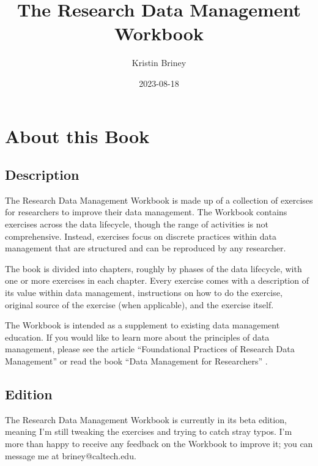\documentclass[
]{book}
\title{The Research Data Management Workbook}
\author{Kristin Briney}
\date{2023-08-18}
\begin{document}
\maketitle

{
\setcounter{tocdepth}{1}
\tableofcontents
}
\hypertarget{about-this-book}{%
\chapter*{About this Book}\label{about-this-book}}

\hypertarget{description}{%
\section*{Description}\label{description}}

The Research Data Management Workbook is made up of a collection of exercises for researchers to improve their data management. The Workbook contains exercises across the data lifecycle, though the range of activities is not comprehensive. Instead, exercises focus on discrete practices within data management that are structured and can be reproduced by any researcher.

The book is divided into chapters, roughly by phases of the data lifecycle, with one or more exercises in each chapter. Every exercise comes with a description of its value within data management, instructions on how to do the exercise, original source of the exercise (when applicable), and the exercise itself.

The Workbook is intended as a supplement to existing data management education. If you would like to learn more about the principles of data management, please see the article ``Foundational Practices of Research Data Management'' \citep{briney_foundational_2020} or read the book ``Data Management for Researchers'' \citep{briney_data_2015}.

\hypertarget{edition}{%
\section*{Edition}\label{edition}}

The Research Data Management Workbook is currently in its beta edition, meaning I'm still tweaking the exercises and trying to catch stray typos. I'm more than happy to receive any feedback on the Workbook to improve it; you can message me at briney@caltech.edu.
\end{document}
